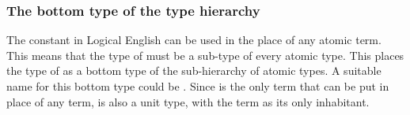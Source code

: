 \documentclass[../main.tex]{subfiles}
\begin{document}
\subsubsection{The bottom type of the type hierarchy}
The constant  in Logical English can be used in the place of any atomic term.
This means that the type of  must be a sub-type of every atomic type. This places the type of  as a bottom type of the sub-hierarchy of atomic types. A suitable name for this bottom type could be . Since  is the only term that can be put in place of any term,  is also a unit type, with the term  as its only inhabitant.

\end{document}
